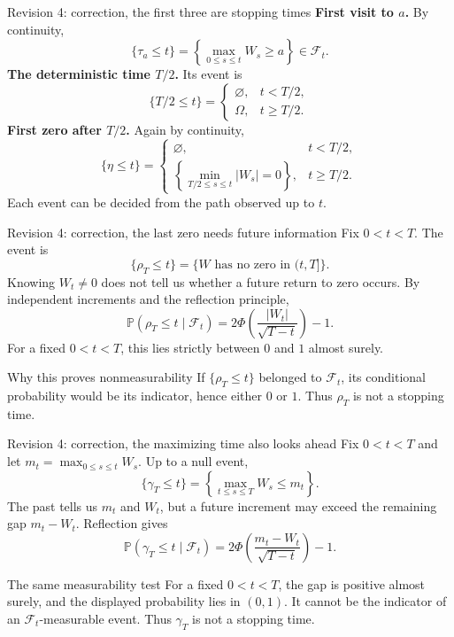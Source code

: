 \documentclass[handout,10pt,aspectratio=169]{beamer}
\newcommand{\Pp}{\mathbb P}
\newcommand{\cF}{\mathcal F}
\newcommand{\1}{\mathbf 1}
\begin{document}
\begin{frame}{Revision 4: correction, the first three are stopping times}
\textbf{First visit to \(a\).} By continuity,
\[
\{\tau_a\le t\}=\left\{\max_{0\le s\le t}W_s\ge a\right\}\in\cF_t.
\]
\textbf{The deterministic time \(T/2\).} Its event is
\[
\{T/2\le t\}=\begin{cases}\varnothing,&t<T/2,\\\Omega,&t\ge T/2.\end{cases}
\]
\textbf{First zero after \(T/2\).} Again by continuity,
\[
\{\eta\le t\}=\begin{cases}
\varnothing,&t<T/2,\\
\left\{\min_{T/2\le s\le t}|W_s|=0\right\},&t\ge T/2.
\end{cases}
\]
Each event can be decided from the path observed up to \(t\).
\end{frame}

\begin{frame}{Revision 4: correction, the last zero needs future information}
Fix \(0<t<T\). The event is
\[
\{\rho_T\le t\}=\{W\text{ has no zero in }(t,T]\}.
\]
Knowing \(W_t\neq0\) does not tell us whether a future return to zero occurs.
By independent increments and the reflection principle,
\[
\boxed{\Pp(\rho_T\le t\mid\cF_t)
=2\Phi\!\left(\frac{|W_t|}{\sqrt{T-t}}\right)-1.}
\]
For a fixed \(0<t<T\), this lies strictly between \(0\) and \(1\) almost surely.
\begin{block}{Why this proves nonmeasurability}
If \(\{\rho_T\le t\}\) belonged to \(\cF_t\), its conditional probability
would be its indicator, hence either \(0\) or \(1\).
Thus \(\rho_T\) is not a stopping time.
\end{block}
\end{frame}

\begin{frame}{Revision 4: correction, the maximizing time also looks ahead}
Fix \(0<t<T\) and let \(m_t=\max_{0\le s\le t}W_s\).
Up to a null event,
\[
\{\gamma_T\le t\}
=\left\{\max_{t\le s\le T}W_s\le m_t\right\}.
\]
The past tells us \(m_t\) and \(W_t\), but a future increment may exceed
the remaining gap \(m_t-W_t\). Reflection gives
\[
\boxed{\Pp(\gamma_T\le t\mid\cF_t)
=2\Phi\!\left(\frac{m_t-W_t}{\sqrt{T-t}}\right)-1.}
\]
\begin{block}{The same measurability test}
For a fixed \(0<t<T\), the gap is positive almost surely, and the displayed
probability lies in \((0,1)\). It cannot be the indicator of an
\(\cF_t\)-measurable event. Thus \(\gamma_T\) is not a stopping time.
\end{block}
\end{frame}
\end{document}
